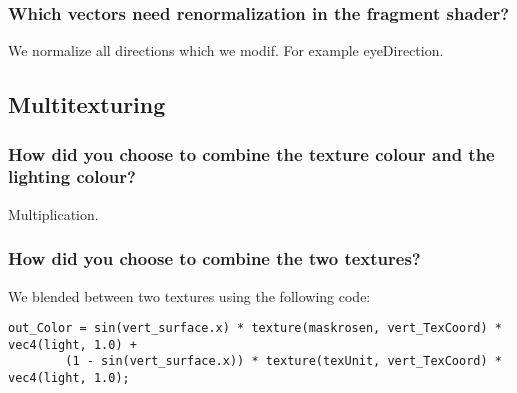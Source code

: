 \documentclass[a4paper,12pt]{article}
\begin{document}
\subsubsection{Which vectors need renormalization in the fragment shader? }
We normalize all directions which we modif. For example eyeDirection.


\subsection{Multitexturing}
\subsubsection{How did you choose to combine the texture colour and the lighting colour?}
Multiplication.
\subsubsection{How did you choose to combine the two textures?}
We blended between two textures using the following code:

\begin{lstlisting}[float,label=lst:lol,caption=nextHopInfo: Fragment shader]
  	out_Color = sin(vert_surface.x) * texture(maskrosen, vert_TexCoord) * vec4(light, 1.0) +
		(1 - sin(vert_surface.x)) * texture(texUnit, vert_TexCoord) * vec4(light, 1.0);
\end{lstlisting}
\end{document}

